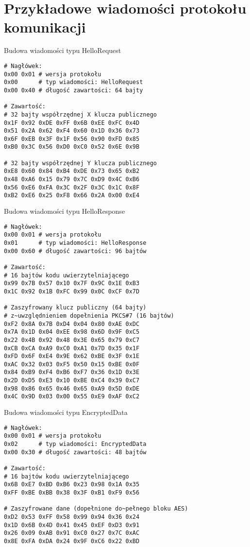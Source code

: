 \chapter{Przykładowe wiadomości protokołu komunikacji}
\label{app:samplerecords}

\begin{table}[ht]
\centering
\caption{Budowa wiadomości typu HelloRequest}
\begin{BVerbatim}
# Nagłówek:
0x00 0x01 # wersja protokołu
0x00      # typ wiadomości: HelloRequest
0x00 0x40 # długość zawartości: 64 bajty

# Zawartość:
# 32 bajty współrzędnej X klucza publicznego
0x1F 0x92 0xDE 0xFF 0x6B 0xEE 0xFC 0x4D
0x51 0x2A 0x62 0xF4 0x60 0x1D 0x36 0x73
0x6F 0xEB 0x3F 0x1F 0x56 0x90 0xFD 0x85
0xB0 0x3C 0x56 0xD0 0xC0 0x52 0x6E 0x9B

# 32 bajty współrzędnej Y klucza publicznego
0xE8 0x60 0x84 0xB4 0xDE 0x73 0x65 0xB2
0x48 0xA6 0x15 0x79 0x7C 0xD9 0x4C 0xB6
0x56 0xE6 0xFA 0x3C 0x2F 0x3C 0x1C 0x8F
0xB2 0xE6 0x25 0xF8 0x66 0x2A 0x00 0xE4
\end{BVerbatim}
\label{fig:hellorequestsample}
\end{table}

\begin{table}
\centering
\caption{Budowa wiadomości typu HelloResponse}
\begin{BVerbatim}
# Nagłówek:
0x00 0x01 # wersja protokołu
0x01      # typ wiadomości: HelloResponse
0x00 0x60 # długość zawartości: 96 bajtów

# Zawartość:
# 16 bajtów kodu uwierzytelniającego
0x99 0x7B 0x57 0x10 0x7F 0x9C 0x1E 0xB3
0x1C 0x92 0x1B 0xFC 0x99 0x0C 0xCF 0x7D

# Zaszyfrowany klucz publiczny (64 bajty)
# z~uwzględnieniem dopełnienia PKCS#7 (16 bajtów)
0xF2 0x8A 0x7B 0xD4 0x04 0x80 0xAE 0xDC
0x7A 0x1D 0x04 0xEE 0x98 0x6D 0x9F 0xC5
0x22 0x4B 0x92 0x48 0x3E 0x65 0x79 0xC7
0xCB 0xCA 0xA9 0xC0 0xA1 0x7D 0x35 0x1F
0xFD 0x6F 0xE4 0x9E 0x62 0xBE 0x3F 0x1E
0xAC 0x32 0x03 0xF5 0x50 0x15 0xBE 0x0F
0x84 0xB9 0xF4 0xB6 0xF7 0x36 0x1D 0x3E
0x2D 0xD5 0xE3 0x10 0xBE 0xC4 0x39 0xC7
0x98 0x86 0x65 0x46 0x65 0xA9 0x5D 0xDE
0x4C 0x9D 0x03 0x00 0x55 0xE9 0xAF 0xC2
\end{BVerbatim}
\label{fig:helloresponsesample}
\end{table}

\begin{table}
\centering
\caption{Budowa wiadomości typu EncryptedData}
\begin{BVerbatim}
# Nagłówek:
0x00 0x01 # wersja protokołu
0x02      # typ wiadomości: EncryptedData
0x00 0x30 # długość zawartości: 48 bajtów

# Zawartość:
# 16 bajtów kodu uwierzytelniającego
0x6B 0xE7 0xBD 0xB6 0x23 0x98 0x1A 0x35
0xFF 0xBE 0xBB 0x38 0x3F 0xB1 0xF9 0x56

# Zaszyfrowane dane (dopełnione do~pełnego bloku AES)
0xD2 0x53 0xFF 0x58 0x99 0x94 0x36 0x24
0x1D 0x6B 0x4D 0x41 0x45 0xEF 0xD3 0x91
0x26 0x09 0xAB 0x91 0xC0 0x27 0x7C 0xAC
0x8E 0xFA 0xDA 0x24 0x9F 0xC6 0x22 0xBD
\end{BVerbatim}
\label{fig:encrypteddatasample}
\end{table}

